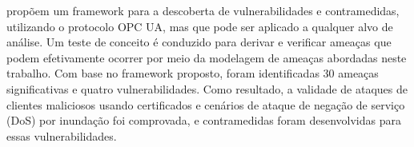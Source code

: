      propõem um framework para a descoberta de vulnerabilidades e contramedidas, utilizando o protocolo OPC UA, mas que pode ser aplicado a qualquer alvo de análise. Um teste de conceito é conduzido para derivar e verificar ameaças que podem efetivamente ocorrer por meio da modelagem de ameaças abordadas neste trabalho. Com base no framework proposto, foram identificadas 30 ameaças significativas e quatro vulnerabilidades. Como resultado, a validade de ataques de clientes maliciosos usando certificados e cenários de ataque de negação de serviço (DoS) por inundação foi comprovada, e contramedidas foram desenvolvidas para essas vulnerabilidades.